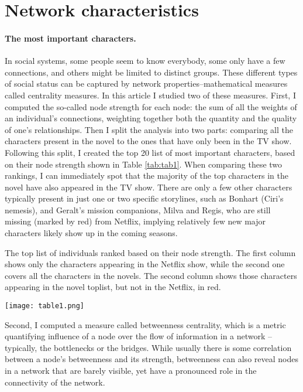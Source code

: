 \documentclass[fleqn,12pt]{wlscirep}
\begin{document}
\section{Network characteristics}


\paragraph{The most important characters.} 

In social systems, some people seem to know everybody, some only have a few connections, and others might be limited to distinct groups. These different types of social status can be captured by network properties–mathematical measures called centrality measures. In this article I studied two of these measures. First, I computed the so-called node strength for each node: the sum of all the weights of an individual’s connections, weighting together both the quantity and the quality of one’s relationships. Then I split the analysis into two parts: comparing all the characters present in the novel to the ones that have only been in the TV show. Following this split, I created the top 20 list of most important characters, based on their node strength shown in Table \ref{tab:tab1}. When comparing these two rankings, I can immediately spot that the majority of the top characters in the novel have also appeared in the TV show. There are only a few other characters typically present in just one or two specific storylines, such as Bonhart (Ciri’s nemesis), and Geralt’s mission companions, Milva and Regis, who are still missing (marked by red) from Netflix, implying relatively few new major characters likely show up in the coming seasons.


\begin{table}
\centering
  \caption{The top list of individuals ranked based on their node strength. The first column shows only the characters appearing in the Netflix show, while the second one covers all the characters in the novels. The second column shows those characters appearing in the novel toplist, but not in the Netflix,  in red.}
  \label{tbl:excel-table}
  \texttt{[image: table1.png]}
  \label{tab:tab1}
\end{table}

Second, I computed a measure called betweenness centrality, which is a metric quantifying influence of a node over the flow of information in a network – typically, the bottlenecks or the bridges. While usually there is some correlation between a node’s betweenness and its strength, betweenness can also reveal nodes in a network that are barely visible, yet have a pronounced role in the connectivity of the network.
\end{document}
